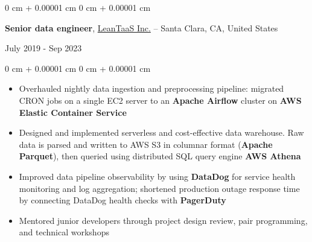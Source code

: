 \documentclass[10pt, letterpaper]{article}
\newenvironment{highlights}{
    \begin{itemize}[
        topsep=0.10 cm,
        parsep=0.10 cm,
        partopsep=0pt,
        itemsep=0pt,
        leftmargin=0 cm + 10pt
    ]
}{
    \end{itemize}
} %
\newenvironment{onecolentry}{
    \begin{adjustwidth}{
        0 cm + 0.00001 cm
    }{
        0 cm + 0.00001 cm
    }
}{
    \end{adjustwidth}
} %
\newenvironment{twocolentry}[2][]{
    \onecolentry
    \def\secondColumn{#2}
    \setcolumnwidth{\fill, 4.5 cm}
    \begin{paracol}{2}
}{
    \switchcolumn \raggedleft \secondColumn
    \end{paracol}
    \endonecolentry
} %
\begin{document}
        \begin{twocolentry}{
            July 2019 - Sep 2023
        }
            \textbf{Senior data engineer}, \href{https://www.leantaas.com}{LeanTaaS Inc.} -- Santa Clara, CA, United States
        \end{twocolentry}
        \vspace{0.10 cm}
        \begin{onecolentry}
            \begin{highlights}
                \item Overhauled nightly data ingestion and preprocessing pipeline: migrated CRON jobs on a single EC2 server to an \textbf{Apache Airflow} cluster on \textbf{AWS Elastic Container Service}
                \item Designed and implemented serverless and cost-effective data warehouse. Raw data is parsed and written to AWS S3 in columnar format (\textbf{Apache Parquet}), then queried using distributed SQL query engine \textbf{AWS Athena}
                \item Improved data pipeline observability by using \textbf{DataDog} for service health monitoring and log aggregation; shortened production outage response time by connecting DataDog health checks with \textbf{PagerDuty}
                \item Mentored junior developers through project design review, pair programming, and technical workshops
            \end{highlights}
        \end{onecolentry}
        \vspace{0.2 cm}

    

            
\end{document}
